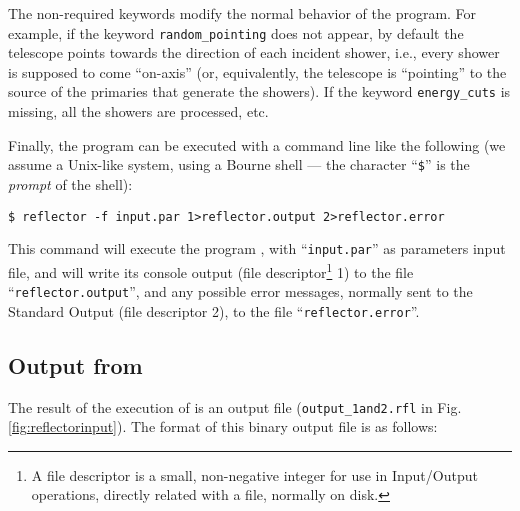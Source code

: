 The non-required keywords modify the normal behavior of the program.
For example, if the keyword \texttt{random\_pointing} does not appear,
by default the telescope points towards the direction of each incident
shower, i.e., every shower is supposed to come ``on-axis'' (or,
equivalently, the telescope is ``pointing'' to the source of the
primaries that generate the showers). If the keyword
\texttt{energy\_cuts} is missing, all the showers are processed, etc.

Finally, the program can be executed with a command line like the
following (we assume a Unix-like system, using a Bourne shell --- the
character ``\texttt{\$}'' is the \emph{prompt} of the shell):
%
\begin{center}
  \texttt{\$ reflector -f input.par 1>reflector.output 2>reflector.error}
\end{center}
%
This command will execute the program , with
``\texttt{input.par}'' as parameters input file, and will write its
console output (file descriptor\footnote{A file descriptor is a small,
  non-negative integer for use in Input/Output operations, directly
  related with a file, normally on disk.} 1) to the file
``\texttt{reflector.output}'', and any possible error messages,
normally sent to the Standard Output (file descriptor 2), to the file
``\texttt{reflector.error}''. 

\subsection{Output from }

The result of the execution of  is an output file
(\texttt{output\_1and2.rfl} in Fig. \ref{fig:reflectorinput}). The
format of this binary output file is as follows:


